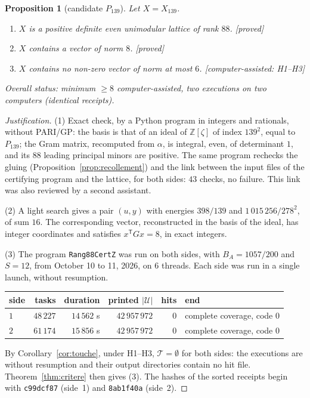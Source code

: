 \documentclass[11pt,a4paper]{amsart}
\theoremstyle{plain}
\newtheorem{proposition}[theorem]{Proposition}
\theoremstyle{definition}
\numberwithin{equation}{section}
\newcommand{\Z}{\mathbb{Z}}
\newcommand{\Uc}{\mathcal{U}}
\newcommand{\Tc}{\mathcal{T}}
\newcommand{\st}[1]{\textup{\textsf{\small[#1]}}}
\newcommand{\DEM}{\st{proved}}
\begin{document}
\begin{proposition}[candidate $P_{139}$]\label{prop:P139}
Let $X=X_{139}$.
\begin{enumerate}[label=\textup{(\arabic*)}]
\item $X$ is a positive definite even unimodular lattice of rank $88$. \DEM
\item $X$ contains a vector of norm $8$. \DEM
\item $X$ contains no non-zero vector of norm at most $6$. \st{computer-assisted: H1--H3}
\end{enumerate}
Overall status: minimum $\ge8$ computer-assisted, two executions on two computers (identical receipts).
\end{proposition}

\begin{proof}[Justification]
(1) Exact check, by a Python program in integers and rationals, without PARI/GP: the basis is that of an ideal of $\Z[\zeta]$ of index $139^2$, equal to $P_{139}$; the Gram matrix, recomputed from $\alpha$, is integral, even, of determinant $1$, and its $88$ leading principal minors are positive. The same program rechecks the gluing (Proposition~\ref{prop:recollement}) and the link between the input files of the certifying program and the lattice, for both sides: $43$ checks, no failure. This link was also reviewed by a second assistant.

(2) A light search gives a pair $(u,y)$ with energies $398/139$ and $1\,015\,256/278^2$, of sum $16$. The corresponding vector, reconstructed in the basis of the ideal, has integer coordinates and satisfies $x^{\mathsf T}Gx=8$, in exact integers.

(3) The program \texttt{Rang88CertZ} was run on both sides, with $B_A=1057/200$ and $S=12$, from October 10 to 11, 2026, on $6$ threads. Each side was run in a single launch, without resumption.
\begin{center}\small
\begin{tabular}{lrrrrl}
\toprule
side & tasks & duration & printed $|\Uc|$ & hits & end \\
\midrule
$1$ & $48\,227$ & $14\,562$ s & $42\,957\,972$ & $0$ & complete coverage, code $0$ \\
$2$ & $61\,174$ & $15\,856$ s & $42\,957\,972$ & $0$ & complete coverage, code $0$ \\
\bottomrule
\end{tabular}
\end{center}
By Corollary~\ref{cor:touche}, under H1--H3, $\Tc=\emptyset$ for both sides: the executions are without resumption and their output directories contain no hit file. Theorem~\ref{thm:critere} then gives (3). The hashes of the sorted receipts begin with \texttt{c99dcf87} (side~1) and \texttt{8ab1f40a} (side~2).
\end{proof}
\end{document}
